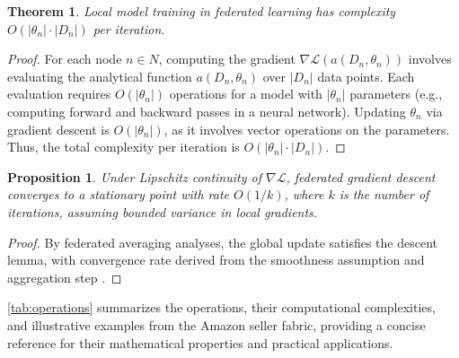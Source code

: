 \documentclass{amsart}
\newtheorem{thm}{Theorem}
\newtheorem{prop}{Proposition}
\begin{document}
\begin{thm} \label{thm:federated_learning_complexity}
Local model training in federated learning has complexity \( O(|\theta_n| \cdot |D_n|) \) per iteration.
\end{thm}
\begin{proof}
For each node \( n \in N \), computing the gradient \( \nabla \mathcal{L}(a(D_n, \theta_n)) \) involves evaluating the analytical function \( a(D_n, \theta_n) \) over \( |D_n| \) data points. Each evaluation requires \( O(|\theta_n|) \) operations for a model with \( |\theta_n| \) parameters (e.g., computing forward and backward passes in a neural network). Updating \( \theta_n \) via gradient descent is \( O(|\theta_n|) \), as it involves vector operations on the parameters. Thus, the total complexity per iteration is \( O(|\theta_n| \cdot |D_n|) \).
\end{proof}

\begin{prop} \label{prop:federated_convergence}
Under Lipschitz continuity of \( \nabla \mathcal{L} \), federated gradient descent converges to a stationary point with rate \( O(1/k) \), where \( k \) is the number of iterations, assuming bounded variance in local gradients.
\end{prop}

\begin{proof}
By federated averaging analyses, the global update satisfies the descent lemma, with convergence rate derived from the smoothness assumption and aggregation step \cite{li2025fedcvg}.
\end{proof}


\cref{tab:operations} summarizes the operations, their computational complexities, and illustrative examples from the Amazon seller fabric, providing a concise reference for their mathematical properties and practical applications.
\end{document}
